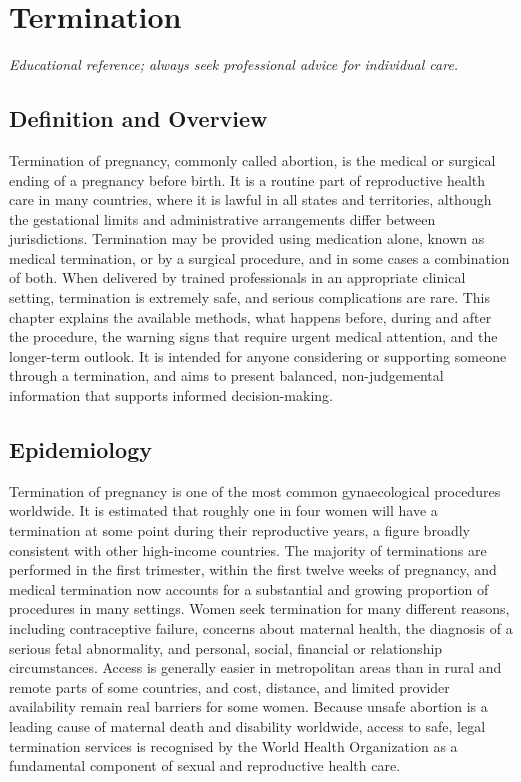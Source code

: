 \chapter{Termination}

\medskip
\noindent\textit{Educational reference; always seek professional advice for individual care.}

\section*{Definition and Overview}
Termination of pregnancy, commonly called abortion, is the medical or surgical ending of a pregnancy before birth. It is a routine part of reproductive health care in many countries, where it is lawful in all states and territories, although the gestational limits and administrative arrangements differ between jurisdictions. Termination may be provided using medication alone, known as medical termination, or by a surgical procedure, and in some cases a combination of both. When delivered by trained professionals in an appropriate clinical setting, termination is extremely safe, and serious complications are rare. This chapter explains the available methods, what happens before, during and after the procedure, the warning signs that require urgent medical attention, and the longer-term outlook. It is intended for anyone considering or supporting someone through a termination, and aims to present balanced, non-judgemental information that supports informed decision-making.

\section*{Epidemiology}
Termination of pregnancy is one of the most common gynaecological procedures worldwide. It is estimated that roughly one in four women will have a termination at some point during their reproductive years, a figure broadly consistent with other high-income countries. The majority of terminations are performed in the first trimester, within the first twelve weeks of pregnancy, and medical termination now accounts for a substantial and growing proportion of procedures in many settings. Women seek termination for many different reasons, including contraceptive failure, concerns about maternal health, the diagnosis of a serious fetal abnormality, and personal, social, financial or relationship circumstances. Access is generally easier in metropolitan areas than in rural and remote parts of some countries, and cost, distance, and limited provider availability remain real barriers for some women. Because unsafe abortion is a leading cause of maternal death and disability worldwide, access to safe, legal termination services is recognised by the World Health Organization as a fundamental component of sexual and reproductive health care.

